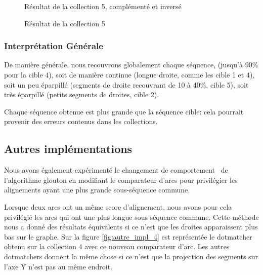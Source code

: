\begin{figure}[!ht]
\begin{minipage}[c]{.46 \linewidth}
\begin{center}
			Résultat de la collection 5, complémenté et inversé
		\end{center}
	\end{minipage}
	\caption{Résultat de la collection 5}
\end{figure}

\FloatBarrier


\subsubsection*{Interprétation Générale}

De manière générale, nous recouvrons globalement chaque séquence, (jusqu'à 90\%
pour la cible 4), soit de manière continue (longue droite, comme les cible 1 et
4), soit un peu éparpillé (segments de droite recouvrant de 10 à 40\%, cible 5),
soit très éparpillé (petits segments de droites, cible 2).

Chaque séquence obtenue est plus grande que la séquence cible: cela pourrait
provenir des erreurs contenus dans les collections.

\subsection{Autres implémentations}

Nous avons également expérimenté le changement de \og comportement \fg~de l'algorithme glouton en modifiant
le comparateur d'arcs pour privilégier les alignements ayant une plus grande
sous-séquence commune.

Lorsque deux arcs ont un même score d'alignement, nous avons pour cela
privilégié les arcs qui ont une plus longue sous-séquence commune. Cette méthode
nous a donné des résultats équivalents si ce n'est que les droites apparaissent
plus bas sur le graphe. Sur la figure \ref{fig:autre_impl_4} est représentée le
dotmatcher obtenu sur la collection 4 avec ce nouveau comparateur d'arc. Les
autres dotmatchers donnent la même chose si ce n'est que la projection des segments sur l'axe Y n'est pas au même endroit.

